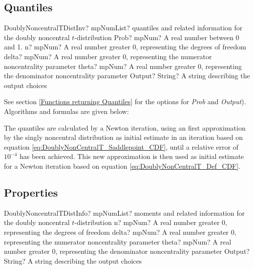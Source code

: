 \subsection{Quantiles}
\label{DoublyNoncentraltDistributionQuantiles}


\begin{mpFunctionsExtract}
	\mpFunctionFiveNotImplemented
	{DoublyNoncentralTDistInv? mpNumList? quantiles and related information for the  doubly noncentral $t$-distribution}
	{Prob? mpNum? A real number between 0 and 1.}
	{n? mpNum? A real number greater 0, representing the degrees of freedom}
	{delta? mpNum? A real number greater 0, representing the numerator noncentrality parameter}
	{theta? mpNum? A real number greater 0, representing the denominator noncentrality parameter}
	{Output? String? A string describing the output choices}
\end{mpFunctionsExtract}

\vspace{0.3cm}
See section \ref{Functions returning Quantiles} for the options for  {\itshape\sffamily Prob} and {\itshape\sffamily Output}). Algorithms and formulas are given below:

The quantiles are calculated by a Newton iteration, using an first approximation by the singly noncentral distribution as initial estimate in an iteration based on equation \ref{eq:DoublyNonCentralT_Saddlepoint_CDF}, until a relative error of $10^{-4}$ has been achieved. This new approximation is then used as initial estimate for a Newton iteration based on equation \ref{eq:DoublyNonCentralT_Def_CDF}.




\subsection{Properties}
\label{DoublyNoncentraltDistributionProperties}

\begin{mpFunctionsExtract}
	\mpFunctionFourNotImplemented
	{DoublyNoncentralTDistInfo? mpNumList? moments and related information for the doubly noncentral $t$-distribution}
	{n? mpNum? A real number greater 0, representing the degrees of freedom}
	{delta? mpNum? A real number greater 0, representing the numerator noncentrality parameter}
	{theta? mpNum? A real number greater 0, representing the denominator noncentrality parameter}
	{Output? String? A string describing the output choices}
\end{mpFunctionsExtract}

